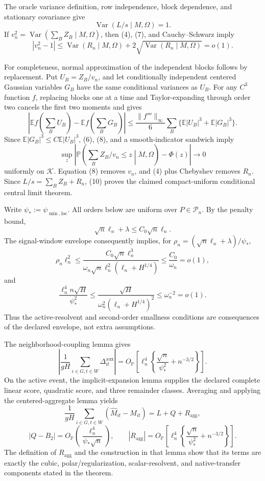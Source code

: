 The oracle variance definition, row independence, block dependence, and stationary covariance give
\[
 \operatorname{Var}(L/s\mid M,\Omega)=1.
 \tag{7}
\]
If \(v_n^2=\operatorname{Var}(\sum_BZ_B\mid M,\Omega)\), then (4), (7), and Cauchy--Schwarz imply
\[
 |v_n^2-1|
 \le\operatorname{Var}(R_n\mid M,\Omega)
 +2\sqrt{\operatorname{Var}(R_n\mid M,\Omega)}=o(1).
 \tag{8}
\]

For completeness, normal approximation of the independent blocks follows by replacement.  Put \(U_B=Z_B/v_n\), and let conditionally independent centered Gaussian variables \(G_B\) have the same conditional variances as \(U_B\).  For any \(C^3\) function \(f\), replacing blocks one at a time and Taylor-expanding through order two cancels the first two moments and gives
\[
 \left|\mathbb Ef\!\left(\sum_BU_B\right)
 -\mathbb Ef\!\left(\sum_BG_B\right)\right|
 \le\frac{\|f'''\|_\infty}{6}
 \sum_B\{\mathbb E|U_B|^3+\mathbb E|G_B|^3\}.
 \tag{9}
\]
Since \(\mathbb E|G_B|^3\le C\mathbb E|U_B|^3\), (6), (8), and a smooth-indicator sandwich imply
\[
 \sup_z\left|\mathbb P\!\left(\sum_BZ_B/v_n\le z\middle|M,\Omega\right)-\Phi(z)\right|\to0
 \tag{10}
\]
uniformly on \(\mathcal K\).  Equation (8) removes \(v_n\), and (4) plus Chebyshev removes \(R_n\).  Since \(L/s=\sum_BZ_B+R_n\), (10) proves the claimed compact-uniform conditional central limit theorem.

Write \(\psi_*:=\psi_{\min,\mathrm{loc}}\).  All orders below are uniform over \(P\in\mathcal P_n\).  By the penalty bound,
\[
 \sqrt n\ell_n+\lambda\le C_0\sqrt n\ell_n.
\]
The signal-window envelope consequently implies, for
\(\rho_n=(\sqrt n\ell_n+\lambda)/\psi_*\),
\[
 \rho_n\ell_n^2
 \le\frac{C_0\sqrt n\ell_n^3}
 {\omega_n\sqrt n\ell_n^2(\ell_n+H^{1/4})}
 \le\frac{C_0}{\omega_n}=o(1),
 \tag{1}
\]
and
\[
 \frac{\ell_n^4n\sqrt H}{\psi_*^2}
 \le\frac{\sqrt H}{\omega_n^2(\ell_n+H^{1/4})^2}
 \le\omega_n^{-2}=o(1).
 \tag{2}
\]
Thus the active-resolvent and second-order smallness conditions are consequences of the declared envelope, not extra assumptions.

The neighborhood-coupling lemma gives
\[
 \left|\frac1{gH}\sum_{i\in G,t\in W}\Delta^{\mathrm{aux}}_{it}\right|
 =O_{\mathbb P}\!\left[
 \ell_n^4\left\{\frac{\sqrt n}{\psi_*^2}+n^{-3/2}\right\}\right].
 \tag{3}
\]
On the active event, the implicit-expansion lemma supplies the declared complete linear score, quadratic score, and three remainder classes.  Averaging and applying the centered-aggregate lemma yields
\[
 \frac1{gH}\sum_{i\in G,t\in W}(\widehat M_{it}-M_{it})
 =L+Q+R_{\mathrm{agg}},
 \tag{4}
\]
\[
 |Q-B_2|=O_{\mathbb P}\!\left(\frac{\ell_n^4}{\psi_*\sqrt n}\right),
 \qquad
 |R_{\mathrm{agg}}|=O_{\mathbb P}\!\left[
 \ell_n^4\left\{\frac{\sqrt n}{\psi_*^2}+n^{-3/2}\right\}\right].
 \tag{5}
\]
The definition of \(R_{\mathrm{agg}}\) and the construction in that lemma show that its terms are exactly the cubic, polar/regularization, scalar-resolvent, and native-transfer components stated in the theorem.

